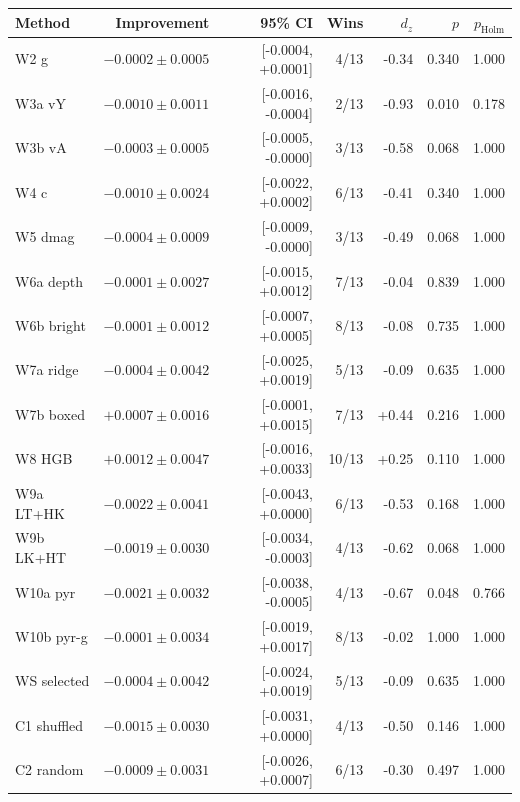 \begin{tabular}{lrrrrrr}
\toprule
Method & Improvement & 95\% CI & Wins & $d_z$ & $p$ & $p_{\mathrm{Holm}}$ \\
\midrule
W2 g & $-0.0002 \pm 0.0005$ & [-0.0004, +0.0001] & 4/13 & -0.34 & 0.340 & 1.000 \\
W3a vY & $-0.0010 \pm 0.0011$ & [-0.0016, -0.0004] & 2/13 & -0.93 & 0.010 & 0.178 \\
W3b vA & $-0.0003 \pm 0.0005$ & [-0.0005, -0.0000] & 3/13 & -0.58 & 0.068 & 1.000 \\
W4 c & $-0.0010 \pm 0.0024$ & [-0.0022, +0.0002] & 6/13 & -0.41 & 0.340 & 1.000 \\
W5 dmag & $-0.0004 \pm 0.0009$ & [-0.0009, -0.0000] & 3/13 & -0.49 & 0.068 & 1.000 \\
W6a depth & $-0.0001 \pm 0.0027$ & [-0.0015, +0.0012] & 7/13 & -0.04 & 0.839 & 1.000 \\
W6b bright & $-0.0001 \pm 0.0012$ & [-0.0007, +0.0005] & 8/13 & -0.08 & 0.735 & 1.000 \\
W7a ridge & $-0.0004 \pm 0.0042$ & [-0.0025, +0.0019] & 5/13 & -0.09 & 0.635 & 1.000 \\
W7b boxed & $+0.0007 \pm 0.0016$ & [-0.0001, +0.0015] & 7/13 & +0.44 & 0.216 & 1.000 \\
W8 HGB & $+0.0012 \pm 0.0047$ & [-0.0016, +0.0033] & 10/13 & +0.25 & 0.110 & 1.000 \\
W9a LT+HK & $-0.0022 \pm 0.0041$ & [-0.0043, +0.0000] & 6/13 & -0.53 & 0.168 & 1.000 \\
W9b LK+HT & $-0.0019 \pm 0.0030$ & [-0.0034, -0.0003] & 4/13 & -0.62 & 0.068 & 1.000 \\
W10a pyr & $-0.0021 \pm 0.0032$ & [-0.0038, -0.0005] & 4/13 & -0.67 & 0.048 & 0.766 \\
W10b pyr-g & $-0.0001 \pm 0.0034$ & [-0.0019, +0.0017] & 8/13 & -0.02 & 1.000 & 1.000 \\
WS selected & $-0.0004 \pm 0.0042$ & [-0.0024, +0.0019] & 5/13 & -0.09 & 0.635 & 1.000 \\
C1 shuffled & $-0.0015 \pm 0.0030$ & [-0.0031, +0.0000] & 4/13 & -0.50 & 0.146 & 1.000 \\
C2 random & $-0.0009 \pm 0.0031$ & [-0.0026, +0.0007] & 6/13 & -0.30 & 0.497 & 1.000 \\
\bottomrule
\end{tabular}
